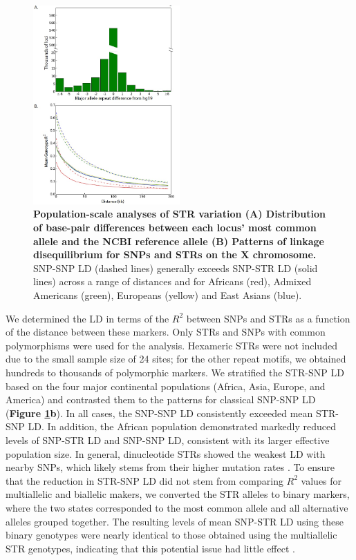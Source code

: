 \begin{figure}[h!]
\centering
\label{fig:catfig5}
\includegraphics[width=0.5\textwidth]{Figures/Chapter3/Fig5.jpg}
\caption{\textbf{Population-scale analyses of STR variation (A) Distribution of base-pair differences between each locus' most common allele and the NCBI reference allele (B) Patterns of linkage disequilibrium for SNPs and STRs on the X chromosome.} SNP-SNP LD (dashed lines) generally exceeds SNP-STR LD (solid lines) across a range of distances and for Africans (red), Admixed Americans (green), Europeans (yellow) and East Asians (blue).}
\end{figure}

We determined the LD in terms of the $R^2$ between SNPs and STRs as a function of the distance between these markers. Only STRs and SNPs with common polymorphisms were used for the analysis. Hexameric STRs were not included due to the small sample size of 24 sites; for the other repeat motifs, we obtained hundreds to thousands of polymorphic markers. We stratified the STR-SNP LD based on the four major continental populations (Africa, Asia, Europe, and America) and contrasted them to the patterns for classical SNP-SNP LD (\textbf{Figure \ref{fig:catfig5}b}). In all cases, the SNP-SNP LD consistently exceeded mean STR-SNP LD. In addition, the African population demonstrated markedly reduced levels of SNP-STR LD and SNP-SNP LD, consistent with its larger effective population size. In general, dinucleotide STRs showed the weakest LD with nearby SNPs, which likely stems from their higher mutation rates \cite{SuppWillemsGymrekHighnamEtAl2014}. To ensure that the reduction in STR-SNP LD did not stem from comparing $R^2$ values for multiallelic and biallelic makers, we converted the STR alleles to binary markers, where the two states corresponded to the most common allele and all alternative alleles grouped together. The resulting levels of mean SNP-STR LD using these binary genotypes were nearly identical to those obtained using the multiallelic STR genotypes, indicating that this potential issue had little effect \cite{SuppWillemsGymrekHighnamEtAl2014}. 

